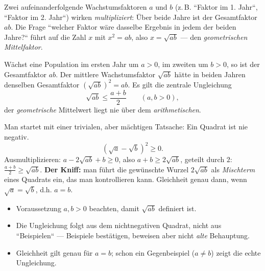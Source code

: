 


Zwei aufeinanderfolgende Wachstumsfaktoren $a$ und $b$ (z.\,B. ``Faktor
im 1. Jahr``, ``Faktor im 2. Jahr``) wirken \emph{multipliziert}: Über
beide Jahre ist der Gesamtfaktor $ab$. Die Frage ``welcher Faktor wäre
dasselbe Ergebnis in jedem der beiden Jahre?`` führt auf die Zahl $x$ mit
$x^2=ab$, also $x=\sqrt{ab}$ --- den \emph{geometrischen Mittelfaktor}.

\begin{werkzeugkasten}
Wächst eine Population im ersten Jahr um $a>0$, im zweiten um $b>0$,
so ist der Gesamtfaktor $ab$. Der mittlere Wachstumsfaktor $\sqrt{ab}$
hätte in beiden Jahren denselben Gesamtfaktor $(\sqrt{ab})^2=ab$.
Es gilt die zentrale Ungleichung
\begin{equation}
  \sqrt{ab}\le \frac{a+b}2 \qquad (a,b>0),
\end{equation}
der \emph{geometrische} Mittelwert liegt nie über dem
\emph{arithmetischen}.
\end{werkzeugkasten}

\begin{werkzeugkasten}
Man startet mit einer trivialen, aber m\"achtigen Tatsache: Ein Quadrat
ist nie negativ.
\begin{equation}
  (\sqrt a-\sqrt b)^2 \ge 0 .
\end{equation}
Ausmultiplizieren: $a-2\sqrt{ab}+b\ge0$, also $a+b\ge2\sqrt{ab}$, geteilt
durch $2$: $\frac{a+b}2\ge\sqrt{ab}$. \textbf{Der Kniff:} man führt die
gewünschte Wurzel $2\sqrt{ab}$ als \emph{Mischterm} eines Quadrats ein,
das man kontrollieren kann. Gleichheit genau dann, wenn
$\sqrt a=\sqrt b$, d.h. $a=b$.
\end{werkzeugkasten}

\begin{achtung}
\begin{itemize}
  \item Voraussetzung $a,b>0$ beachten, damit $\sqrt{ab}$ definiert ist.
  \item Die Ungleichung folgt aus dem nichtnegativen Quadrat, nicht aus
        ``Beispielen`` --- Beispiele bestätigen, beweisen aber nicht
        \emph{alte} Behauptung.
  \item Gleichheit gilt genau für $a=b$; schon ein Gegenbeispiel
        ($a\neq b$) zeigt die echte Ungleichung.
\end{itemize}
\end{achtung}
